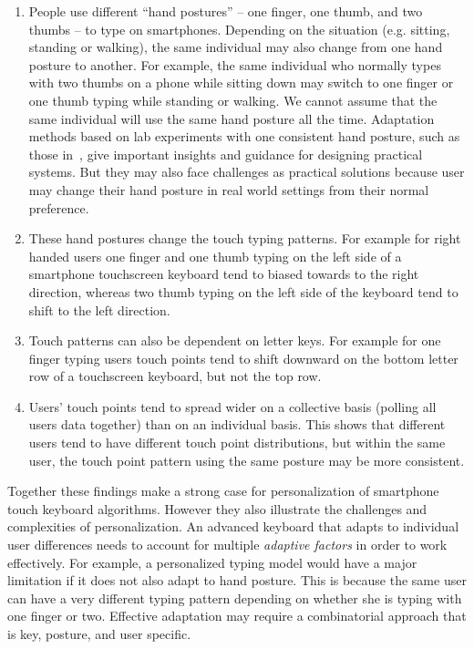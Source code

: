 \documentclass{sigchi}
\begin{document}
\begin{enumerate}
\item People use different “hand postures” -- one finger, one thumb, and two thumbs -- to type on smartphones. Depending on the situation (e.g. sitting, standing or walking), the same individual may also change from one hand posture to another. For example, the same individual who normally types with two thumbs on a phone while sitting down may switch to one finger or one thumb typing while standing or walking. We cannot assume that the same individual will use the same hand posture all the time. Adaptation methods based on lab experiments with one consistent hand  posture, such as those in~\cite{Findlater:2012}, give important insights and guidance for designing practical systems. But they may also face challenges as practical solutions because user may change their hand posture in real world settings from their normal preference.

\item These hand postures change the touch typing patterns. For example for right handed users one finger and one thumb typing on the left side of a smartphone touchscreen keyboard tend to biased towards to the right direction, whereas two thumb typing on the left side of the keyboard tend to shift to the left direction.

\item Touch patterns can also be dependent on letter keys. For example for one finger typing users touch points tend to shift downward on the bottom letter row of a touchscreen keyboard, but not the top row. 

\item Users’ touch points tend to spread wider on a collective basis (polling all users data together) than on an individual basis. This shows that different users tend to have different touch point distributions, but within the same user, the touch point pattern using the same posture may be more consistent.
\end{enumerate}

Together these findings make a strong case for personalization of smartphone touch keyboard algorithms. However they also illustrate the challenges and complexities of personalization. An advanced keyboard that adapts to individual user differences needs to account for multiple \textit{adaptive factors} in order to work effectively. For example, a personalized typing model would have a major limitation if it does not also adapt to hand posture. This is because the same user can have a very different typing pattern depending on whether she is typing with one finger or two. Effective adaptation may require a combinatorial approach that is key, posture, and user specific. 
\end{document}
